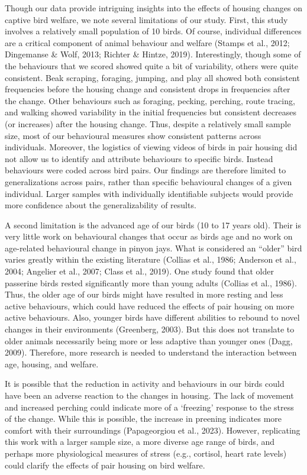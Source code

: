 \documentclass[
  pub]{apa6}
\begin{document}
Though our data provide intriguing insights into the effects of housing changes on captive bird welfare, we note several limitations of our study. First, this study involves a relatively small population of 10 birds. Of course, individual differences are a critical component of animal behaviour and welfare (Stamps et al., 2012; Dingemanse \& Wolf, 2013; Richter \& Hintze, 2019). Interestingly, though some of the behaviours that we scored showed quite a bit of variability, others were quite consistent. Beak scraping, foraging, jumping, and play all showed both consistent frequencies before the housing change and consistent drops in frequencies after the change. Other behaviours such as foraging, pecking, perching, route tracing, and walking showed variability in the initial frequencies but consistent decreases (or increases) after the housing change. Thus, despite a relatively small sample size, most of our behavioural measures show consistent patterns across individuals. Moreover, the logistics of viewing videos of birds in pair housing did not allow us to identify and attribute behaviours to specific birds. Instead behaviours were coded across bird pairs. Our findings are therefore limited to generalizations across pairs, rather than specific behavioural changes of a given individual. Larger samples with individually identifiable subjects would provide more confidence about the generalizability of results.

A second limitation is the advanced age of our birds (10 to 17 years old). Their is very little work on behavioural changes that occur as birds age and no work on age-related behavioural change in pinyon jays. What is considered an ``older'' bird varies greatly within the existing literature (Collias et al., 1986; Anderson et al., 2004; Angelier et al., 2007; Class et al., 2019). One study found that older passerine birds rested significantly more than young adults (Collias et al., 1986). Thus, the older age of our birds might have resulted in more resting and less active behaviours, which could have reduced the effects of pair housing on more active behaviours. Also, younger birds have different abilities to rebound to novel changes in their environments (Greenberg, 2003). But this does not translate to older animals necessarily being more or less adaptive than younger ones (Dagg, 2009). Therefore, more research is needed to understand the interaction between age, housing, and welfare.

It is possible that the reduction in activity and behaviours in our birds could have been an adverse reaction to the changes in housing. The lack of movement and increased perching could indicate more of a `freezing' response to the stress of the change. While this is possible, the increase in preening indicates more comfort with their surroundings (Papageorgiou et al., 2023). However, replicating this work with a larger sample size, a more diverse age range of birds, and perhaps more physiological measures of stress (e.g., cortisol, heart rate levels) could clarify the effects of pair housing on bird welfare.
\end{document}
